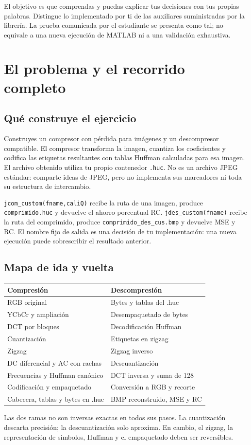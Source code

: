 \documentclass[11pt,a4paper,oneside]{report}
\begin{document}
El objetivo es que comprendas y puedas explicar tus decisiones con tus propias
palabras. Distingue lo implementado por ti de las auxiliares suministradas
por la librería. La prueba comunicada por el estudiante se presenta como tal;
no equivale a una nueva ejecución de MATLAB ni a una validación exhaustiva.
\setcounter{tocdepth}{1}
\tableofcontents
\clearpage{}
\chapter{El problema y el recorrido completo}

\section{Qué construye el ejercicio}

Construyes un compresor con pérdida para imágenes y un descompresor compatible.
El compresor transforma la imagen, cuantiza los coeficientes y codifica las
etiquetas resultantes con tablas Huffman calculadas para esa imagen.
El archivo obtenido utiliza tu propio contenedor \texttt{.huc}. No es un
archivo JPEG estándar: comparte ideas de JPEG, pero no implementa sus
marcadores ni toda su estructura de intercambio.

\texttt{jcom\_custom(fname,caliQ)} recibe la ruta de una imagen, produce
\texttt{comprimido.huc} y devuelve el ahorro porcentual RC.
\texttt{jdes\_custom(fname)} recibe la ruta del comprimido, produce
\texttt{comprimido\_des\_cus.bmp} y devuelve MSE y RC.
El nombre fijo de salida es una decisión de tu implementación: una nueva
ejecución puede sobrescribir el resultado anterior.


\section{Mapa de ida y vuelta}

\begin{center}\begin{tabular}{p{}p{}}
\toprule Compresión & Descompresión \\\midrule
RGB original & Bytes y tablas del .huc\\
YCbCr y ampliación & Desempaquetado de bytes\\
DCT por bloques & Decodificación Huffman\\
Cuantización & Etiquetas en zigzag\\
Zigzag & Zigzag inverso\\
DC diferencial y AC con rachas & Descuantización\\
Frecuencias y Huffman canónico & DCT inversa y suma de 128\\
Codificación y empaquetado & Conversión a RGB y recorte\\
Cabecera, tablas y bytes en .huc & BMP reconstruido, MSE y RC\\\bottomrule
\end{tabular}\end{center}
Las dos ramas no son inversas exactas en todos sus pasos. La cuantización
descarta precisión; la descuantización solo aproxima. En cambio, el zigzag,
la representación de símbolos, Huffman y el empaquetado deben ser reversibles.
\end{document}
